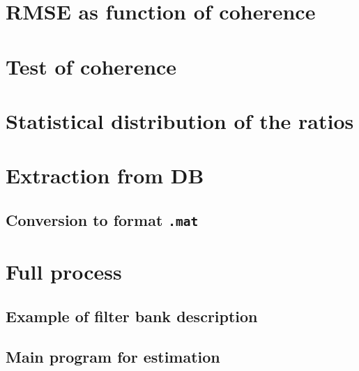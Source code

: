 \documentclass[a4paper, 12pt]{report}
\begin{document}
 \section{RMSE as function of coherence}
{\tiny }

  \newpage
  \section{Test of coherence}
{\tiny }
 
 \newpage
 \section{Statistical distribution of the ratios}
{\tiny }

  
\newpage
  \section{Extraction from DB}
  
{\tiny }

\subsection{Conversion to format {\tt .mat}}
{\tiny }

{\tiny }



\newpage
  \section{Full process}


  \subsection{Example of filter bank description}
{\tiny }

\subsection{Main program for estimation}
{\tiny }
\end{document}
